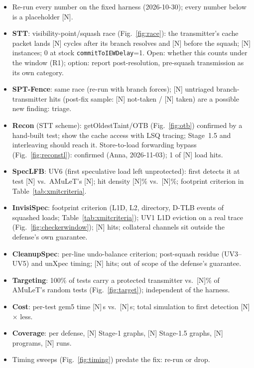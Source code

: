 {\color{cfigtodo}\footnotesize{}
\begin{itemize}
\item Re-run every number on the fixed harness (2026-10-30); every number below is a placeholder [N].
\item \textbf{STT}: visibility-point/squash race (Fig.~\ref{fig:race}): the transmitter's cache packet lands [N] cycles after its branch resolves and [N] before the squash; [N] instances; 0 at stock \texttt{commitToIEWDelay}=1. Open: whether this counts under the window (R1); option: report post-resolution, pre-squash transmission as its own category.
\item \textbf{SPT-Fence}: same race (re-run with branch forces); [N] untriaged branch-transmitter hits (post-fix sample: [N] not-taken / [N] taken) are a possible new finding: triage.
\item \textbf{Recon} (STT scheme): getOldestTaint/OTB (Fig.~\ref{fig:otb}) confirmed by a hand-built test; show the cache access with LSQ tracing; Stage~1.5 and interleaving should reach it. Store-to-load forwarding bypass (Fig.~\ref{fig:reconstl}): confirmed (Anna, 2026-11-03); 1 of [N] load hits.
\item \textbf{SpecLFB}: UV6 (first speculative load left unprotected): \toolname{} first detects it at test [N] vs.\ AMuLeT's [N]; hit density [N]\% vs.\ [N]\%; footprint criterion in Table~\ref{tab:xmitcriteria}.
\item \textbf{InvisiSpec}: footprint criterion (L1D, L2, directory, D-TLB events of squashed loads; Table~\ref{tab:xmitcriteria}); UV1 L1D eviction on a real trace (Fig.~\ref{fig:checkerwindow}); [N] hits; collateral channels sit outside the defense's own guarantee.
\item \textbf{CleanupSpec}: per-line undo-balance criterion; post-squash residue (UV3--UV5) and unXpec timing; [N] hits; out of scope of the defense's guarantee.
\item \textbf{Targeting}: 100\% of \toolname{} tests carry a protected transmitter vs.\ [N]\% of AMuLeT's random tests (Fig.~\ref{fig:target}); independent of the harness.
\item \textbf{Cost}: per-test gem5 time [N]\,s vs.\ [N]\,s; total simulation to first detection [N]$\times$ less.
\item \textbf{Coverage}: per defense, [N] Stage-1 graphs, [N] Stage-1.5 graphs, [N] programs, [N] runs.
\item Timing sweeps (Fig.~\ref{fig:timing}) predate the fix: re-run or drop.
\end{itemize}}
\fi


